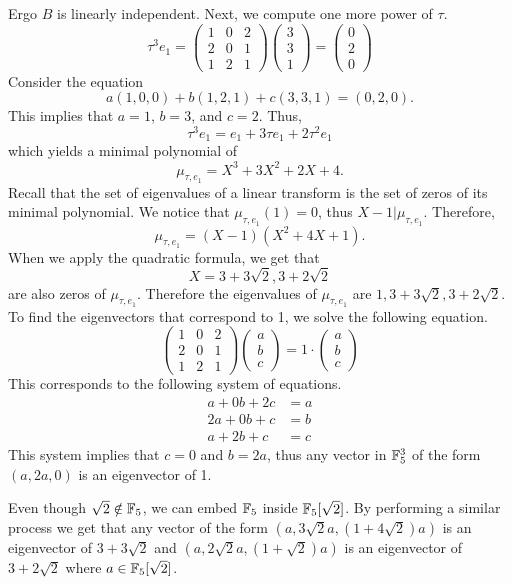 \documentclass[notitlepage]{problem-solving}
\begin{document}
Ergo $B$ is linearly independent.
Next, we compute one more power of $\tau$.
\[
\tau^3 e_1 =
\begin{pmatrix}
	1 & 0 & 2\\
	2 & 0 & 1\\
	1 & 2 & 1
\end{pmatrix}
\begin{pmatrix}
	3\\
	3\\
	1
\end{pmatrix}
=
\begin{pmatrix}
	0\\
	2\\
	0
\end{pmatrix}
\]
Consider the equation
\[
	a(1,0,0)+b(1,2,1)+c(3,3,1)=(0,2,0).
\]
This implies that $a=1$, $b=3$, and $c=2$.
Thus,
\[
	\tau^3e_1=e_1 + 3\tau e_1 + 2 \tau^2 e_1
\]
which yields a minimal polynomial of
\[
	\mu_{\tau, e_1} = X^3 +3X^2 + 2X +4.
\]
Recall that the set of eigenvalues of a linear transform is the set of zeros of its minimal polynomial.
We notice that $\mu_{\tau,e_1}(1)=0$, thus $X-1|\mu_{\tau,e_1}$.
Therefore,
\[
	\mu_{\tau,e_1} = (X-1)(X^2+4X+1).
\]
When we apply the quadratic formula, we get that
\[
	X= 3 + 3\sqrt{2}, 3+2\sqrt{2}
\]
are also zeros of $\mu_{\tau,e_1}$.
Therefore the eigenvalues of $\mu_{\tau,e_1}$ are $1, 3+3\sqrt{2}, 3+2\sqrt{2}$.
To find the eigenvectors that correspond to 1, we solve the following equation.
\[
\begin{pmatrix}
	1 & 0 & 2\\
	2 & 0 & 1\\
	1 & 2 & 1
\end{pmatrix}
\begin{pmatrix}
	a\\
	b\\
	c
\end{pmatrix}
=
1\cdot
\begin{pmatrix}
	a\\
	b\\
	c
\end{pmatrix}
\]
This corresponds to the following system of equations.
\begin{align*}
	a + 0b + 2c &= a\\
	2a + 0b + c &= b\\
	a + 2b + c &= c
\end{align*}
This system implies that $c = 0$ and $b = 2a$, thus any vector in $\mathbb{F}_5^3$ of the form $(a,2a,0)$ is an eigenvector of 1.

Even though $\sqrt{2}\notin\mathbb{F}_5$, we can embed $\mathbb{F}_5$ inside $\mathbb{F}_5[\sqrt{2}]$.
By performing a similar process we get that any vector of the form $(a,3\sqrt{2} a, (1+4\sqrt{2})a)$ is an eigenvector of $3+3\sqrt{2}$ and $(a,2\sqrt{2} a, (1+\sqrt{2})a)$ is an eigenvector of $3+2\sqrt{2}$ where $a\in\mathbb{F}_{5}[\sqrt{2}]$.

\printbibliography
\end{document}

